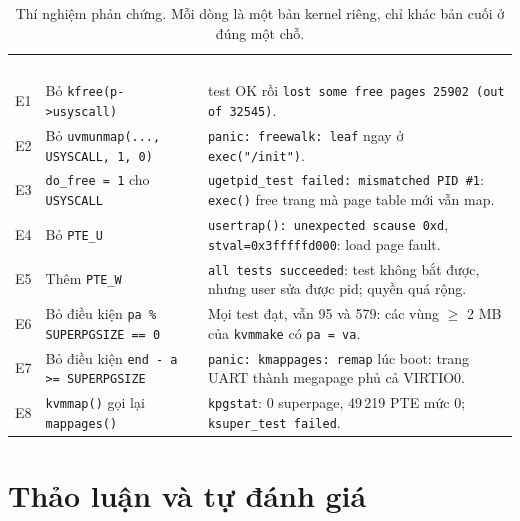 \documentclass[10pt,a4paper]{article}
\newcommand{\cc}[1]{\texttt{#1}}
\newcommand{\thd}[1]{\textcolor{white}{\textbf{#1}}}
\newcommand{\headrow}{\rowcolor{hcmus}}
\begin{document}
\begin{table}[H]
\centering\footnotesize
\begin{tabularx}{\linewidth}{@{}c >{\raggedright\arraybackslash}p{5.0cm} >{\raggedright\arraybackslash}X@{}}
\headrow \thd{} & \thd{Thay đổi} & \thd{Kết quả thật và kết luận} \\
E1 & Bỏ \cc{kfree(p->usyscall)} & 60 test OK rồi \cc{lost some free pages 25902 (out of 32545)}. \\
\rowcolor{rowalt}
E2 & Bỏ \cc{uvmunmap(..., USYSCALL, 1, 0)} & \cc{panic: freewalk: leaf} ngay ở \cc{exec("/init")}. \\
E3 & \cc{do\_free = 1} cho \cc{USYSCALL} & \cc{ugetpid\_test failed: mismatched PID \#1}: \cc{exec()} free trang mà page table mới vẫn map. \\
\rowcolor{rowalt}
E4 & Bỏ \cc{PTE\_U} & \cc{usertrap(): unexpected scause 0xd}, \cc{stval=0x3fffffd000}: load page fault. \\
E5 & Thêm \cc{PTE\_W} & \cc{all tests succeeded}: test không bắt được, nhưng user sửa được pid; quyền quá rộng. \\
\rowcolor{rowalt}
E6 & Bỏ điều kiện \cc{pa \% SUPERPGSIZE == 0} & Mọi test đạt, vẫn 95 và 579: các vùng $\ge$ 2 MB của \cc{kvmmake} có \cc{pa = va}. \\
E7 & Bỏ điều kiện \cc{end - a >= SUPERPGSIZE} & \cc{panic: kmappages: remap} lúc boot: trang UART thành megapage phủ cả VIRTIO0. \\
\rowcolor{rowalt}
E8 & \cc{kvmmap()} gọi lại \cc{mappages()} & \cc{kpgstat}: 0 superpage, 49\,219 PTE mức 0; \cc{ksuper\_test failed}. \\
\bottomrule
\end{tabularx}
\caption{Thí nghiệm phản chứng. Mỗi dòng là một bản kernel riêng, chỉ khác bản cuối ở đúng một chỗ.}\label{tab:exp}
\end{table}

\section{Thảo luận và tự đánh giá}\label{sec:discussion}
\end{document}
